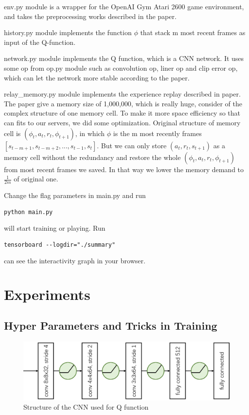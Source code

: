 \documentclass[10pt,twocolumn,letterpaper]{article}
\begin{document}
\begin{CJK}{UTF8}{gbsn}
env.py module is a wrapper for the OpenAI Gym Atari 2600 game environment, and takes the preprocessing works described in the paper. 

history.py module implements the function $\phi$ that stack m most recent frames as input of the Q-function. 

network.py module implements the Q function, which is a CNN network. It uses some op from op.py module such as convolution op, liner op and clip error op, which can let the network more stable according to the paper. 

relay\_memory.py module implements the experience replay described in paper. The paper give a memory size of 1,000,000, which is really huge, consider of the complex structure of one memory cell. To make it more space efficiency so that can fits to our servers, we did some optimization. Original structure of memory cell is $(\phi_t, a_t, r_t, \phi_{t+1})$, in which $\phi$ is the m most recently frames $[s_{t-m+1}, s_{t-m+2}, ..., s_{t-1}, s_t]$. But we can only store $(a_t, r_t, s_{t+1})$ as a memory cell without the redundancy and restore the whole $(\phi_t, a_t, r_t, \phi_{t+1})$ from most recent frames we saved. In that way we lower the memory demand to $\frac{1}{2m}$ of original one.

Change the flag parameters in main.py and run 
\begin{lstlisting}
python main.py
\end{lstlisting}
will start training or playing. Run 
\begin{lstlisting}
tensorboard --logdir="./summary"
\end{lstlisting}
can see the interactivity graph in your browser.

\section{Experiments}

\subsection{Hyper Parameters and Tricks in Training}

\begin{figure}
\begin{center}
   \includegraphics[width=1.0\linewidth]{net.png}
\end{center}
\caption{Structure of the CNN used for Q function}
\label{fig:net}
\end{figure}


\end{CJK}
\end{document}
